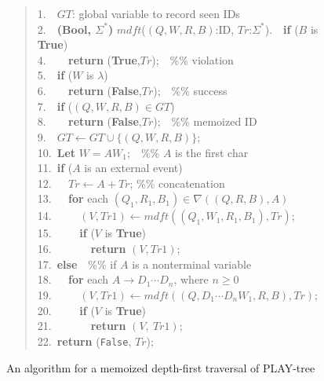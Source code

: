 \documentclass[]{llncs}
\begin{document}
\begin{figure}[htp]
\begin{quote}
{
\small\tt

1.~~$GT$: global variable to record seen IDs\\
2.~~{\bf (Bool, $\Sigma^{*}$)} $mdft$($(Q, W, R, B)$:ID, $Tr$:$\Sigma^{*}$).~~{\bf if} ($B$ is {\bf True}) \\
4.~~\verb+  +{\bf return} ({\bf True},$Tr$);~~\%\% violation\\
5.~~{\bf if} ($W$ is $\lambda$)\\
6.~~\verb+  +{\bf return} ({\bf False},$Tr$);~~\%\% success\\
7.~~{\bf if} ($(Q, W, R, B) \in GT$)\\
8.~~\verb+  +{\bf return} ({\bf False},$Tr$);~~\%\% memoized ID\\
9.~~$GT \leftarrow GT \cup \{(Q,W,R,B)\}$;\\
10.~{\bf Let} $W = AW_1$;~~\%\% $A$ is the first char\\
11.~{\bf if} ($A$ is an external event) \\
12.~\verb+  +$Tr \leftarrow A + Tr$; \%\% concatenation\\
13.~\verb+  +{\bf for} each $(Q_1,R_1,B_1) \in \nabla((Q,R,B),A)$\\
14.~\verb+    +$(V,Tr1) \leftarrow mdft((Q_1,W_1,R_1,B_1),Tr)$;\\
15.~\verb+    +{\bf if} ($V$ is {\bf True})\\
16.~\verb+      +{\bf return} $(V,Tr1)$;\\
17.~{\bf else}~~\%\% if $A$ is a nonterminal variable\\
18.~\verb+  +{\bf for} each $A \rightarrow D_1\cdots D_n$, where $n \geq 0$\\
19.~\verb+    +$(V,Tr1) \leftarrow mdft((Q,D_1\cdots D_nW_1,R,B),Tr)$;\\
20.~\verb+    +{\bf if} ($V$ is {\bf True})\\
21.~\verb+      +{\bf return} $(V,~Tr1)$;\\
22.~{\bf return} ({\tt False}, $Tr$);
}
\end{quote}
\caption{An algorithm for a memoized depth-first traversal of PLAY-tree}
\label{fig:mdft}
\end{figure}
\end{document}
